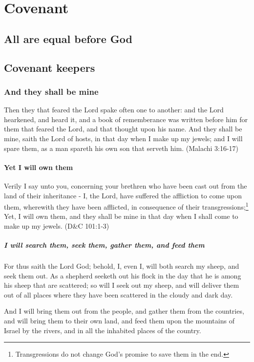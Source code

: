 \chapter{Covenant}

\section{All are equal before God}

\section{Covenant keepers}

\subsection{And they shall be mine}
Then they that feared the Lord spake often one to another: and the Lord hearkened, and heard it, and a book of rememberance was written before him for them that feared the Lord, and that thought upon his name. And they shall be mine, saith the Lord of hosts, in that day when I make up my jewels; and I will spare them, as a man spareth his own son that serveth him. (Malachi 3:16-17)

\subsubsection{Yet I will own them}
Verily I say unto you, concerning your brethren who have been cast out from the land of their inheritance - I, the Lord, have suffered the affliction to come upon them, wherewith they have been afflicted, in consequence of their transgressions;\footnote{Transgressions do not change God's promise to save them in the end.} Yet, I will own them, and they shall be mine in that day when I shall come to make up my jewels. (D\&C 101:1-3)

\paragraph{I will search them, seek them, gather them, and feed them}
For thus saith the Lord God; behold, I, even I, will both search my sheep, and seek them out. As a shepherd seeketh out his flock in the day that he is among his sheep that are scattered; so will I seek out my sheep, and will deliver them out of all places where they have been scattered in the cloudy and dark day.

And I will bring them out from the people, and gather them from the countries, and will bring them to their own land, and feed them upon the mountains of Israel by the rivers, and in all the inhabited places of the country. 

